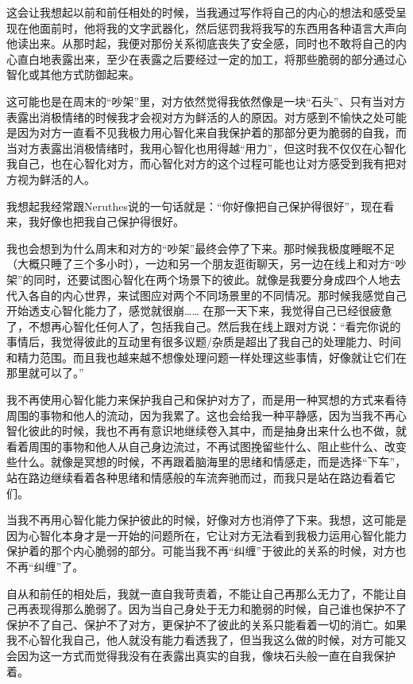这会让我想起以前和前任相处的时候，当我通过写作将自己的内心的想法和感受呈现在他面前时，他将我的文字武器化，然后惩罚我将我写的东西用各种语言大声向他读出来。从那时起，我便对那份关系彻底丧失了安全感，同时也不敢将自己的内心直白地表露出来，至少在表露之后要经过一定的加工，将那些脆弱的部分通过心智化或其他方式防御起来。

这可能也是在周末的“吵架”里，对方依然觉得我依然像是一块“石头”、只有当对方表露出消极情绪的时候我才会视对方为鲜活的人的原因。对方感到不愉快之处可能是因为对方一直看不见我极力用心智化来自我保护着的那部分更为脆弱的自我，而当对方表露出消极情绪时，我用心智化也用得越“用力”，但这时我不仅仅在心智化我自己，也在心智化对方，而心智化对方的这个过程可能也让对方感受到我有把对方视为鲜活的人。

我想起我经常跟Neruthes说的一句话就是：“你好像把自己保护得很好”，现在看来，我好像也把我自己保护得很好。

我也会想到为什么周末和对方的“吵架”最终会停了下来。那时候我极度睡眠不足（大概只睡了三个多小时），一边和另一个朋友逛街聊天，另一边在线上和对方“吵架”的同时，还要试图心智化在两个场景下的彼此。就像是我要分身成四个人地去代入各自的内心世界，来试图应对两个不同场景里的不同情况。那时候我感觉自己开始透支心智化能力了，感觉就很崩…… 在那一天下来，我觉得自己已经很疲惫了，不想再心智化任何人了，包括我自己。然后我在线上跟对方说：“看完你说的事情后，我觉得彼此的互动里有很多议题/杂质是超出了我自己的处理能力、时间和精力范围。而且我也越来越不想像处理问题一样处理这些事情，好像就让它们在那里就可以了。”

我不再使用心智化能力来保护我自己和保护对方了，而是用一种冥想的方式来看待周围的事物和他人的流动，因为我累了。这也会给我一种平静感，因为当我不再心智化彼此的时候，我也不再有意识地继续卷入其中，而是抽身出来什么也不做，就看着周围的事物和他人从自己身边流过，不再试图挽留些什么、阻止些什么、改变些什么。就像是冥想的时候，不再跟着脑海里的思绪和情感走，而是选择“下车”，站在路边继续看着各种思绪和情感般的车流奔驰而过，而我只是站在路边看着它们。

当我不再用心智化能力保护彼此的时候，好像对方也消停了下来。我想，这可能是因为心智化本身才是一开始的问题所在，它让对方无法看到我极力运用心智化能力保护着的那个内心脆弱的部分。可能当我不再“纠缠”于彼此的关系的时候，对方也不再“纠缠”了。

自从和前任的相处后，我就一直自我苛责着，不能让自己再那么无力了，不能让自己再表现得那么脆弱了。因为当自己身处于无力和脆弱的时候，自己谁也保护不了\pozhehao{}保护不了自己、保护不了对方，更保护不了彼此的关系\pozhehao{}只能看着一切的消亡。如果我不心智化我自己，他人就没有能力看透我了，但当我这么做的时候，对方可能又会因为这一方式而觉得我没有在表露出真实的自我，像块石头般一直在自我保护着。

